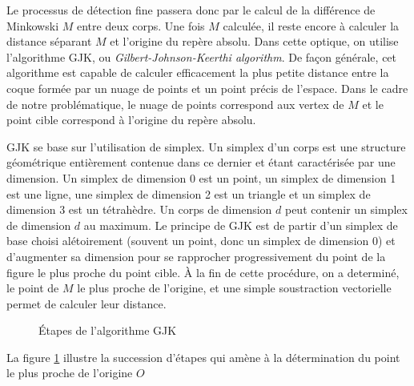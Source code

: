 Le processus de détection fine passera donc par le calcul de la
différence de Minkowski $M$ entre deux corps. Une fois $M$ calculée,
il reste encore à calculer la distance séparant $M$ et l'origine du
repère absolu. Dans cette optique, on utilise l'algorithme GJK, ou
\textit{Gilbert-Johnson-Keerthi algorithm}. De façon générale, cet
algorithme est capable de calculer efficacement la plus petite
distance entre la coque formée par un nuage de points et un point
précis de l'espace. Dans le cadre de notre problématique, le nuage de
points correspond aux vertex de $M$ et le point cible correspond à
l'origine du repère absolu.

GJK se base sur l'utilisation de simplex. Un simplex d'un corps est
une structure géométrique entièrement contenue dans ce dernier et
étant caractérisée par une dimension. Un simplex de dimension 0 est un
point, un simplex de dimension 1 est une ligne, une simplex de
dimension 2 est un triangle et un simplex de dimension 3 est un
tétrahèdre. Un corps de dimension $d$ peut contenir un simplex de
dimension $d$ au maximum. Le principe de GJK est de partir d'un
simplex de base choisi alétoirement (souvent un point, donc un simplex
de dimension 0) et d'augmenter sa dimension pour se rapprocher
progressivement du point de la figure le plus proche du point
cible. \`A la fin de cette procédure, on a determiné, le point de $M$
le plus proche de l'origine, et une simple soustraction vectorielle
permet de calculer leur distance.

\begin{figure}
  \centering

  \subfloat[]{  }
  \subfloat[]{  }
  \qquad
  \subfloat[]{  }
  \subfloat[]{  }
  \qquad
  \subfloat[]{  }
  \subfloat[]{  }

  \caption{{\'E}tapes de l'algorithme GJK}
  \label{gjk}
\end{figure}

La figure \ref{gjk} illustre la succession d'étapes qui amène à la
détermination du point le plus proche de l'origine $O$

